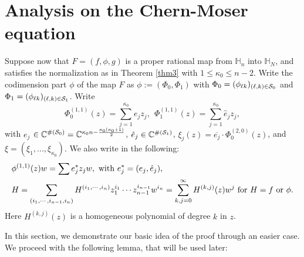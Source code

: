 \documentclass[12pt]{article}
\numberwithin{equation}{section}
\def\CC{{\mathbb C}}
\def\HH{{\mathbb H}}
\begin{document}
\section{ Analysis on the Chern-Moser equation}

Suppose now that
$F=(f,\phi,g)$ is a proper rational map from ${\HH}_n$ into
${\HH}_N$, and satisfies the normalization as in Theorem \ref{thm3}
with $1\le \kappa_0\le n-2$.
Write the codimension part $\phi$ of the map $F$ as
$\phi:=(\Phi_0,\Phi_1)$ with $\Phi_0=(\phi_{\ell k})_{(\ell , k)\in
{\cal S}_0}$ and $\Phi_1=(\phi_{\ell k})_{(\ell, k)\in {\cal S}_1}$.
Write
\[
\Phi_0^{(1,1)}(z)= \sum_{j=1}^{\kappa_0} {e_j} z_j,\ \
\Phi_1^{(1,1)}(z)= \sum_{j=1}^{\kappa_0} \hat{e}_j z_j,
\]
with
{${e_j}$}  $\in {\CC}^{\#({\cal S}_0)}={\CC}^{\kappa_0n-\frac{\kappa_0(\kappa_0+1)}{2}}$,
 $\hat{e}_j \in \CC^{\#({\cal S}_1)}$,
$\xi_j(z) = \overline{{e}_j} \cdot \Phi^{(2,0)}_0(z)$, and $\xi=(\xi_1,
..., \xi_{\kappa_0})$. We also
 write in the following:
\begin{equation*}\label{007}
\begin{split}
&\phi^{(1,1)}(z)w=\sum e_j^*z_jw,\ \hbox{with}\ e_j^*=(e_j,\hat{e}_j),\\
&H=\sum_{(i_1,\cdots,i_{n-1},i_n)}
H^{(i_1,\cdots,i_n)}z_1^{i_1}\cdots
z_{n-1}^{i_{n-1}}w^{i_n}=\sum_{k,j=0}^{\infty} H^{(k,j)}(z)w^j\
\text{for}\ H=f\ \text{or}\ \phi.
\end{split}
\end{equation*}
Here $H^{(k,j)}(z)$ is a homogeneous polynomial of degree $k$ in
$z$.

In this section, we demonstrate our basic idea of the proof through an easier case.
 We proceed with the following lemma, that will be used later:
\end{document}

